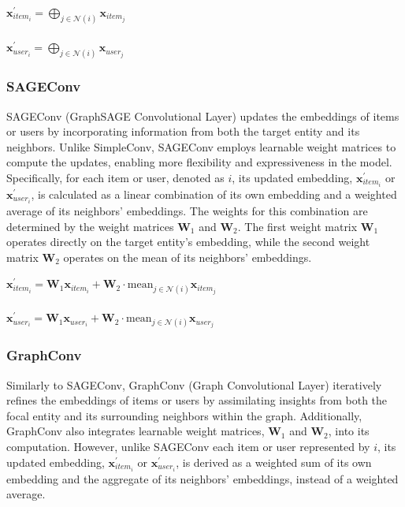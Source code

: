 \documentclass[bst/sn-nature]{sn-jnl}
\begin{document}
\begin{multicols}{2}
\begin{center}
    $\mathbf{x}^{\prime}_{item_{i}} = \bigoplus_{j \in \mathcal{N}(i)} \mathbf{x}_{item_{j}}$ \\~\\
    $\mathbf{x}^{\prime}_{user_{i}} = \bigoplus_{j \in \mathcal{N}(i)} \mathbf{x}_{user_{j}}$
\end{center}

\subsubsection{SAGEConv\cite{sageconv}} 

\quad SAGEConv (GraphSAGE Convolutional Layer) updates the embeddings of items or users by incorporating information from both the target entity and its neighbors. Unlike SimpleConv, SAGEConv employs learnable weight matrices to compute the updates, enabling more flexibility and expressiveness in the model. Specifically, for each item or user, denoted as $i$, its updated embedding, $\mathbf{x}^{\prime}_{item_i}$ or $\mathbf{x}^{\prime}_{user_i}$, is calculated as a linear combination of its own embedding and a weighted average of its neighbors' embeddings. The weights for this combination are determined by the weight matrices $\mathbf{W}_1$ and $\mathbf{W}_2$. The first weight matrix $\mathbf{W}_1$ operates directly on the target entity's embedding, while the second weight matrix $\mathbf{W}_2$ operates on the mean of its neighbors' embeddings. \\ 

\begin{center}
    $\mathbf{x}^{\prime}_{item_{i}} = \mathbf{W}_1 \mathbf{x}_{item_{i}} + \mathbf{W}_2 \cdot \mathrm{mean}_{j \in \mathcal{N}(i)} \mathbf{x}_{item_{j}}$ \\~\\
    $\mathbf{x}^{\prime}_{user_{i}} = \mathbf{W}_1 \mathbf{x}_{user_{i}} + \mathbf{W}_2 \cdot \mathrm{mean}_{j \in \mathcal{N}(i)} \mathbf{x}_{user_{j}}$
\end{center}

\subsubsection{GraphConv\cite{graphconv}} 

\quad Similarly to SAGEConv, GraphConv (Graph Convolutional Layer) iteratively refines the embeddings of items or users by assimilating insights from both the focal entity and its surrounding neighbors within the graph. Additionally, GraphConv also integrates learnable weight matrices, $\mathbf{W}_1$ and $\mathbf{W}_2$, into its computation. However, unlike SAGEConv each item or user represented by $i$, its updated embedding, $\mathbf{x}^{\prime}_{item_i}$ or $\mathbf{x}^{\prime}_{user_i}$, is derived as a weighted sum of its own embedding and the aggregate of its neighbors' embeddings, instead of a weighted average. \\ 


\end{multicols}
\end{document}
